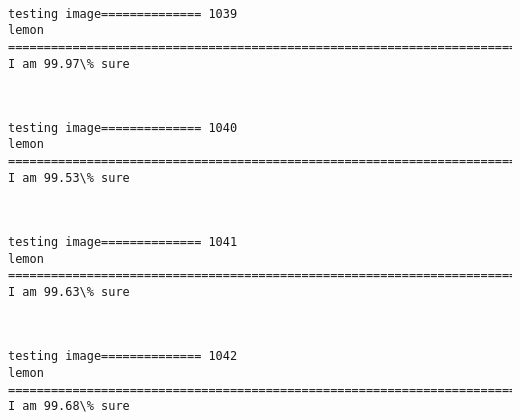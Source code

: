\documentclass[11pt]{article}
\begin{document}
    \begin{center}
    \end{center}
    { \hspace*{\fill} \\}
    
    \begin{Verbatim}[commandchars=\\\{\}]
testing image============== 1039
lemon
============================================================================
I am 99.97\% sure

    \end{Verbatim}

    \begin{center}
    \end{center}
    { \hspace*{\fill} \\}
    
    \begin{Verbatim}[commandchars=\\\{\}]
testing image============== 1040
lemon
============================================================================
I am 99.53\% sure

    \end{Verbatim}

    \begin{center}
    \end{center}
    { \hspace*{\fill} \\}
    
    \begin{Verbatim}[commandchars=\\\{\}]
testing image============== 1041
lemon
============================================================================
I am 99.63\% sure

    \end{Verbatim}

    \begin{center}
    \end{center}
    { \hspace*{\fill} \\}
    
    \begin{Verbatim}[commandchars=\\\{\}]
testing image============== 1042
lemon
============================================================================
I am 99.68\% sure

    \end{Verbatim}
\end{document}
